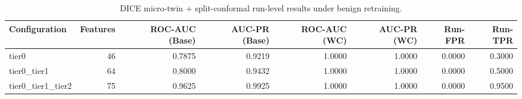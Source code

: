 \begin{table}[t]
\centering
\caption{DICE micro-twin + split-conformal run-level results under benign retraining.}
\label{tab:dice_full_overall}
\footnotesize
\begin{tabular}{lrrrrrrr}
\toprule
Configuration & Features & ROC-AUC (Base) & AUC-PR (Base) & ROC-AUC (WC) & AUC-PR (WC) & Run-FPR & Run-TPR \\
\midrule
tier0 & 46 & 0.7875 & 0.9219 & 1.0000 & 1.0000 & 0.0000 & 0.3000 \\
tier0_tier1 & 64 & 0.8000 & 0.9432 & 1.0000 & 1.0000 & 0.0000 & 0.5000 \\
tier0_tier1_tier2 & 75 & 0.9625 & 0.9925 & 1.0000 & 1.0000 & 0.0000 & 0.9500 \\
\bottomrule
\end{tabular}

\end{table}

